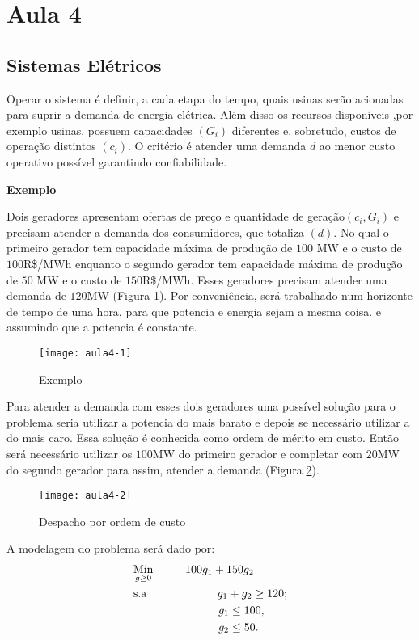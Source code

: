 \section{Aula 4}
\label{sec:4}

\subsection{Sistemas Elétricos}
Operar o sistema é definir, a cada etapa do tempo, quais usinas serão acionadas para suprir a demanda de energia elétrica. Além disso os
recursos disponíveis ,por exemplo usinas, possuem capacidades $(G_{i})$ diferentes
e, sobretudo, custos de operação distintos $(c_{i})$. O critério é atender uma demanda $d$ ao menor custo operativo possível garantindo confiabilidade. 

\textbf{Exemplo}

Dois geradores apresentam ofertas de preço e quantidade de geração$(c_{i},G_{i})$ e precisam atender a demanda dos consumidores, que
totaliza $(d)$. No qual o primeiro gerador tem capacidade máxima de produção de $100$ MW e o custo de $100$R\$/MWh enquanto o segundo gerador tem
capacidade máxima de produção de $50$ MW e o custo de $150$R\$/MWh. Esses geradores precisam atender uma demanda de $120$MW (Figura \ref{fig:aula4-1}). Por conveniência, será trabalhado num horizonte de tempo de uma hora, para que potencia
e energia sejam a mesma coisa. e assumindo que a potencia é constante.
\begin{figure}[H]
\begin{centering}
\texttt{[image: aula4-1]}\protect\caption{\label{fig:aula4-1} Exemplo }
\end{centering}
\end{figure}
Para atender a demanda com esses dois geradores uma possível solução para o problema seria utilizar a potencia do mais barato e depois se necessário utilizar a do mais caro. Essa solução é conhecida como ordem de mérito em custo. Então será necessário utilizar os $100$MW
do primeiro gerador e completar com $20$MW do segundo gerador para assim, atender a demanda (Figura \ref{fig:aula4-2}).
\begin{figure}[H]
\begin{centering}
\texttt{[image: aula4-2]}\protect\caption{\label{fig:aula4-2} Despacho por ordem de custo }
\end{centering}
\end{figure}
A modelagem do problema será dado por:
\begin{align}
    & \underset{g\geq0}{\text{Min}} \hspace{1cm} 100g_1+150g_2 \label{eq1} \\
    & \text{s.a}  \hspace{2.2cm} g_1+g_2 \geq 120; \label{eq2} \\
    &             \hspace{2.65cm} g_1\leq 100, \label{eq3}\\
    &             \hspace{2.65cm} g_2\leq 50. \label{eq4}
\end{align}

